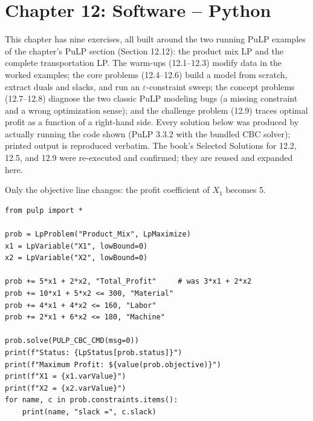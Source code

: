 
\section{Chapter 12: Software -- Python}

This chapter has nine exercises, all built around the two running PuLP
examples of the chapter's PuLP section (Section 12.12): the product mix LP
and the complete transportation LP. The warm-ups (12.1--12.3) modify data in the worked
examples; the core problems (12.4--12.6) build a model from scratch, extract
duals and slacks, and run an $\varepsilon$-constraint sweep; the concept
problems (12.7--12.8) diagnose the two classic PuLP modeling bugs (a missing
constraint and a wrong optimization sense); and the challenge problem (12.9)
traces optimal profit as a function of a right-hand side. Every solution below
was produced by actually running the code shown (PuLP 3.3.2 with the bundled
CBC solver); printed output is reproduced verbatim. The book's Selected
Solutions for 12.2, 12.5, and 12.9 were re-executed and confirmed; they are
reused and expanded here.


Only the objective line changes: the profit coefficient of $X_1$ becomes 5.

\begin{verbatim}
from pulp import *

prob = LpProblem("Product_Mix", LpMaximize)
x1 = LpVariable("X1", lowBound=0)
x2 = LpVariable("X2", lowBound=0)

prob += 5*x1 + 2*x2, "Total_Profit"     # was 3*x1 + 2*x2
prob += 10*x1 + 5*x2 <= 300, "Material"
prob += 4*x1 + 4*x2 <= 160, "Labor"
prob += 2*x1 + 6*x2 <= 180, "Machine"

prob.solve(PULP_CBC_CMD(msg=0))
print(f"Status: {LpStatus[prob.status]}")
print(f"Maximum Profit: ${value(prob.objective)}")
print(f"X1 = {x1.varValue}")
print(f"X2 = {x2.varValue}")
for name, c in prob.constraints.items():
    print(name, "slack =", c.slack)
\end{verbatim}

